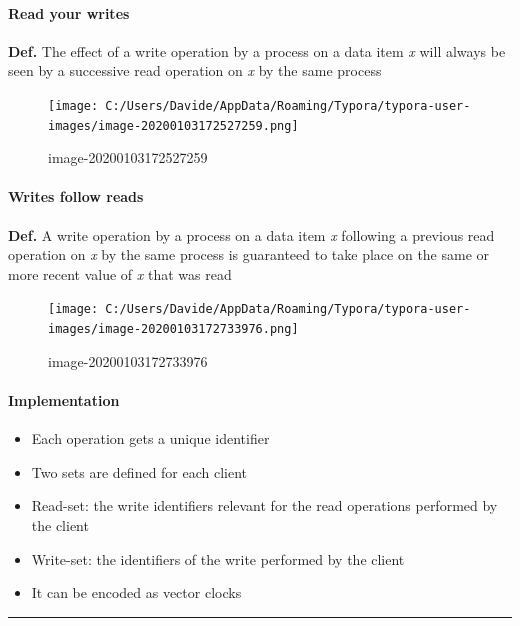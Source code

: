 \paragraph{Read your writes}\label{read-your-writes}

\textbf{Def.} The effect of a write operation by a process on a data
item \emph{x} will always be seen by a successive read operation on
\emph{x} by the same process

\begin{figure}[htbp]
\centering
\texttt{[image: C:/Users/Davide/AppData/Roaming/Typora/typora-user-images/image-20200103172527259.png]}
\caption{image-20200103172527259}
\end{figure}

\paragraph{Writes follow reads}\label{writes-follow-reads}

\textbf{Def.} A write operation by a process on a data item \emph{x}
following a previous read operation on \emph{x} by the same process is
guaranteed to take place on the same or more recent value of \emph{x}
that was read

\begin{figure}[htbp]
\centering
\texttt{[image: C:/Users/Davide/AppData/Roaming/Typora/typora-user-images/image-20200103172733976.png]}
\caption{image-20200103172733976}
\end{figure}

\paragraph{Implementation}\label{implementation-1}

\begin{itemize}
\itemsep1pt\parskip0pt
\item
  Each operation gets a unique identifier
\item
  Two sets are defined for each client
\item
  Read-set: the write identifiers relevant for the read operations
  performed by the client
\item
  Write-set: the identifiers of the write performed by the client
\item
  It can be encoded as vector clocks
\end{itemize}

\begin{center}\rule{3in}{0.4pt}\end{center}

